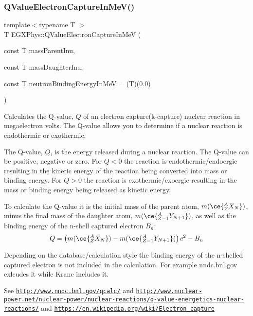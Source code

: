 \subsubsection{\texorpdfstring{Q\+Value\+Electron\+Capture\+In\+Me\+V()}{QValueElectronCaptureInMeV()}}
{\footnotesize\ttfamily template$<$typename T $>$ \\
T E\+G\+X\+Phys\+::\+Q\+Value\+Electron\+Capture\+In\+MeV (\begin{DoxyParamCaption}\item[{const T}]{mass\+Parent\+Inu,  }\item[{const T}]{mass\+Daughter\+Inu,  }\item[{const T}]{neutron\+Binding\+Energy\+In\+MeV = {\ttfamily (T)(0.0)} }\end{DoxyParamCaption})}



Calculates the Q-\/value, $Q$ of an electron capture(k-\/capture) nuclear reaction in megaelectron volts. The Q-\/value allows you to determine if a nuclear reaction is endothermic or exothermic. 

The Q-\/value, $Q$, is the energy released during a nuclear reaction. The Q-\/value can be positive, negative or zero. For $Q < 0$ the reaction is endothermic/endoergic resulting in the kinetic energy of the reaction being converted into mass or binding energy. For $Q > 0$ the reaction is exothermic/exoergic resulting in the mass or binding energy being released as kinetic energy.

To calculate the Q-\/value it is the initial mass of the parent atom, $m(\ce{ ^{A}_{Z}X_{N} })$, minus the final mass of the daughter atom, $m(\ce{ ^{A}_{Z-1}Y_{N +1} })$, as well as the binding energy of the n-\/shell captured electron $B_n$\+: \[Q = \left ( m(\ce{ ^{A}_{Z}X_{N} })-m(\ce{ ^{A}_{Z-1}Y_{N +1} }) \right) c^2-B_n\]

Depending on the database/calculation style the binding energy of the n-\/shelled captured electron is not included in the calculation. For example nndc.\+bnl.\+gov exlcudes it while Krane includes it.

See \href{http://www.nndc.bnl.gov/qcalc/}{\tt http\+://www.\+nndc.\+bnl.\+gov/qcalc/} and \href{http://www.nuclear-power.net/nuclear-power/nuclear-reactions/q-value-energetics-nuclear-reactions/}{\tt http\+://www.\+nuclear-\/power.\+net/nuclear-\/power/nuclear-\/reactions/q-\/value-\/energetics-\/nuclear-\/reactions/} and \href{https://en.wikipedia.org/wiki/Electron_capture}{\tt https\+://en.\+wikipedia.\+org/wiki/\+Electron\+\_\+capture}

